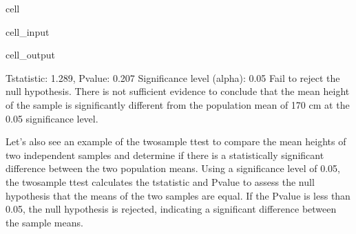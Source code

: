 \documentclass[letterpaper,10pt,english]{jupyterBook}
\begin{document}
\begin{sphinxuseclass}{cell}
\begin{sphinxVerbatimInput}
\begin{sphinxuseclass}{cell_input}
\end{sphinxuseclass}\end{sphinxVerbatimInput}
\begin{sphinxVerbatimOutput}

\begin{sphinxuseclass}{cell_output}
\begin{sphinxVerbatim}[commandchars=\\\{\}]
T\PYGZhy{}statistic: 1.289, P\PYGZhy{}value: 0.207
Significance level (alpha): 0.05
Fail to reject the null hypothesis. There is not sufficient evidence to conclude that the mean height of the sample is significantly different from the population mean of 170 cm at the 0.05 significance level.
\end{sphinxVerbatim}

\noindent{}

\end{sphinxuseclass}\end{sphinxVerbatimOutput}

\end{sphinxuseclass}
\sphinxAtStartPar
Let’s also see an example of the two\sphinxhyphen{}sample t\sphinxhyphen{}test to compare the mean heights of two independent samples and determine if there is a statistically significant difference between the two population means. Using a significance level of 0.05, the two\sphinxhyphen{}sample t\sphinxhyphen{}test calculates the t\sphinxhyphen{}statistic and P\sphinxhyphen{}value to assess the null hypothesis that the means of the two samples are equal. If the P\sphinxhyphen{}value is less than 0.05, the null hypothesis is rejected, indicating a significant difference between the sample means.
\end{document}

